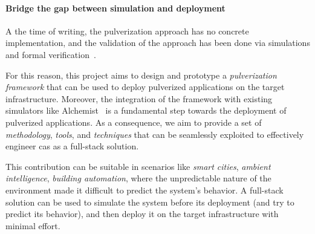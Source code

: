 \documentclass[12pt,a4paper]{article}
\newcommand{\meta}[1]{{\color{blue}#1}}
\begin{document}
\paragraph{Bridge the gap between simulation and deployment}\label{sec:bridge-gap}
\meta{
A the time of writing,
the pulverization approach has no concrete implementation,
and the validation of the approach has been done via simulations and formal verification~\cite{DBLP:journals/fi/CasadeiPPVW20, DBLP:journals/iotj/CasadeiFPPSV22}.

For this reason,
this project aims to design and prototype a \emph{pulverization framework} that can be used to deploy pulverized applications on the target infrastructure.
%
Moreover,
the integration of the framework with existing simulators like Alchemist~\cite{DBLP:journals/jos/PianiniMV13} is a fundamental step towards the deployment of pulverized applications.
%
As a consequence,
we aim to provide a set of \emph{methodology},
\emph{tools},
and \emph{techniques} that can be seamlessly exploited to effectively engineer \ac{cas} as a full-stack solution.

This contribution can be suitable in scenarios like \emph{smart cities},
\emph{ambient intelligence},
\emph{building automation},
where the unpredictable nature of the environment made it difficult to predict the system's behavior.
%
A full-stack solution can be used to simulate the system before its deployment (and try to predict its behavior),
and then deploy it on the target infrastructure with minimal effort.
}
\end{document}

